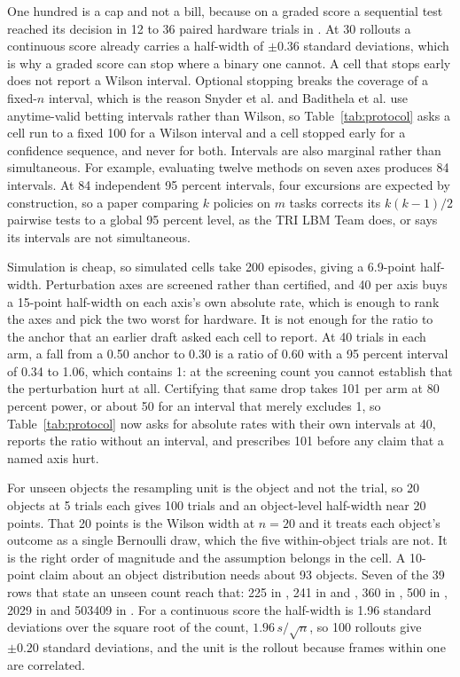 One hundred is a cap and not a bill, because on a graded score a sequential test reached its
decision in 12 to 36 paired hardware trials in \cite{beyond_binary_success_2026}. At 30 rollouts a
continuous score already carries a half-width of $\pm 0.36$ standard deviations, which is why a
graded score can stop where a binary one cannot. A cell that stops early does not report a Wilson
interval. Optional stopping breaks the coverage of a fixed-$n$ interval, which is the reason
Snyder et al. \cite{beyond_binary_success_2026} and Badithela et al. \cite{suresim_2025} use
anytime-valid betting intervals rather than Wilson, so Table~\ref{tab:protocol} asks a cell run to
a fixed 100 for a Wilson interval and a cell stopped early for a confidence sequence, and never
for both. Intervals are also marginal rather than simultaneous. For example, evaluating twelve methods on seven axes produces 84 intervals. At 84 independent 95 percent intervals, four
excursions are expected by construction, so a paper comparing $k$ policies on $m$ tasks corrects
its $k(k-1)/2$ pairwise tests to a global 95 percent level, as the TRI LBM Team
\cite{lbm_careful_examination_2025} does, or says its intervals are not simultaneous.

Simulation is cheap, so simulated cells take 200 episodes, giving a 6.9-point half-width.
Perturbation axes are screened rather than certified, and 40 per axis buys a 15-point half-width
on each axis's own absolute rate, which is enough to rank the axes and pick the two worst for
hardware. It is not enough for the ratio to the anchor that an earlier draft asked each cell to
report. At 40 trials in each arm, a fall from a 0.50 anchor to 0.30 is a ratio of 0.60 with a 95
percent interval of 0.34 to 1.06, which contains 1: at the screening count you cannot establish
that the perturbation hurt at all. Certifying that same drop takes 101 per arm at 80 percent
power, or about 50 for an interval that merely excludes 1, so Table~\ref{tab:protocol} now asks for
absolute rates with their own intervals at 40, reports the ratio without an interval, and prescribes
101 before any claim that a named axis hurt.

For unseen objects the resampling unit is the object and not the trial, so 20 objects at 5 trials
each gives 100 trials and an object-level half-width near 20 points. That 20 points is the Wilson
width at $n = 20$ and it treats each object's outcome as a single Bernoulli draw, which the five
within-object trials are not. It is the right order of magnitude and the assumption belongs in the
cell. A 10-point claim about an object distribution needs about 93 objects. Seven of the 39 rows
that state an unseen count reach that: 225 in \cite{bimangrasp_2024}, 241 in \cite{resdex_2024}
and \cite{unidexgrasp_2023}, 360 in \cite{dexgraspvla_2025}, 500 in \cite{dexmv_2021}, 2029 in
\cite{clutterdexgrasp_2025} and 503409 in \cite{graspxl_2024}. For a continuous score the
half-width is 1.96 standard deviations over the square root of the count, $1.96\,s/\sqrt{n}$, so
100 rollouts give $\pm 0.20$ standard deviations, and the unit is the rollout because frames
within one are correlated.

